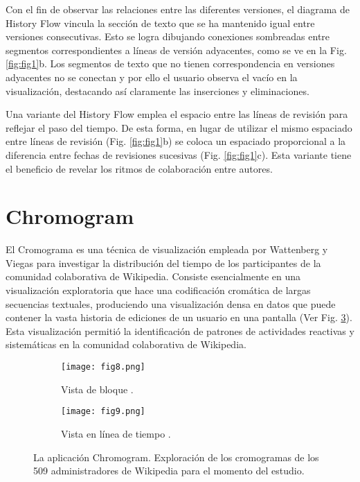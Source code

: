 Con el fin de observar las relaciones entre las diferentes versiones, el diagrama de History Flow vincula la sección de texto que se ha mantenido igual entre versiones consecutivas. Esto se logra dibujando conexiones sombreadas entre segmentos correspondientes a líneas de versión adyacentes, como se ve en la Fig. \ref{fig:fig1}b. Los segmentos de texto que no tienen correspondencia en versiones adyacentes no se conectan y por ello el usuario observa el vacío en la visualización, destacando así claramente las inserciones y eliminaciones.

Una variante del History Flow emplea el espacio entre las líneas de revisión para reflejar el paso del tiempo. De esta forma, en lugar de utilizar el mismo espaciado entre líneas de revisión (Fig. \ref{fig:fig1}b) se coloca un espaciado proporcional a la diferencia entre fechas de revisiones sucesivas (Fig. \ref{fig:fig1}c). Esta variante tiene el beneficio de revelar los ritmos de colaboración entre autores.

\section{Chromogram}
El Cromograma es una técnica de visualización empleada por Wattenberg y Viegas \cite{Wat07} para investigar la distribución del tiempo de los participantes de la comunidad colaborativa de Wikipedia. Consiste esencialmente en una visualización exploratoria que hace una codificación cromática de largas secuencias textuales, produciendo una visualización densa en datos que puede contener la vasta historia de ediciones de un usuario en una pantalla (Ver Fig. \ref{fig:fig8-9}). Esta visualización permitió la identificación de patrones de actividades reactivas y sistemáticas en la comunidad colaborativa de Wikipedia.

\begin{figure}[htp]
  \begin{subfigure}[b]{0.5\textwidth}
    \centering
    \texttt{[image: fig8.png]}
    \caption[]{Vista de bloque \cite[Fig. 3]{Wat07}.}
    \label{fig:fig8}
  \end{subfigure}
  \hfill
  \begin{subfigure}[b]{0.45\textwidth}
    \centering
    \texttt{[image: fig9.png]}
    \caption[]{Vista en línea de tiempo \cite[Fig. 4]{Wat07}.}
    \label{fig:fig9}
  \end{subfigure}
  \caption[La aplicacieon Chromogram]{La aplicación Chromogram. Exploración de los cromogramas de los 509 administradores de Wikipedia para el momento del estudio.}
  \label{fig:fig8-9}
\end{figure}

